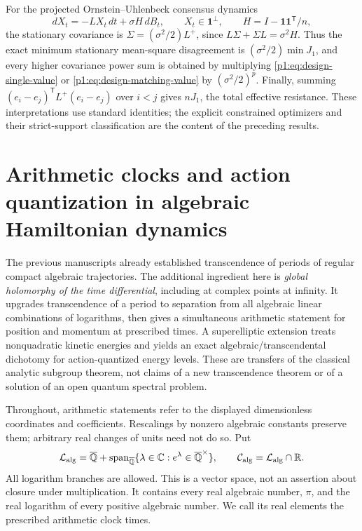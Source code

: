 \documentclass[11pt,a4paper]{article}
\theoremstyle{definition}
\theoremstyle{remark}
\numberwithin{equation}{section}
\begin{document}
For the projected Ornstein--Uhlenbeck consensus dynamics
\[
 dX_t=-LX_t\,dt+\sigma H\,dB_t,\qquad X_t\in\mathbf1^\perp,
 \qquad H=I-\mathbf1\mathbf1^{\mathsf T}/n,
\]
the stationary covariance is $\Sigma=(\sigma^2/2)L^+$, since
$L\Sigma+\Sigma L=\sigma^2H$.
Thus the exact minimum stationary mean-square disagreement is
$(\sigma^2/2)\min J_1$, and every higher covariance power sum is obtained
by multiplying \eqref{p1:eq:design-single-value} or
\eqref{p1:eq:design-matching-value} by $(\sigma^2/2)^p$.
Finally, summing $(e_i-e_j)^{\mathsf T}L^+(e_i-e_j)$ over $i<j$ gives
$nJ_1$, the total effective resistance.  These interpretations use standard
identities; the explicit constrained optimizers and their strict-support
classification are the content of the preceding results.



\section{Arithmetic clocks and action quantization in algebraic Hamiltonian dynamics}
\label{p1:pt:section}

The previous manuscripts already established transcendence of periods of
regular compact algebraic trajectories.  The additional ingredient here is
\emph{global holomorphy of the time differential}, including at complex
points at infinity.  It upgrades transcendence of a period to separation
from all algebraic linear combinations of logarithms, then gives a
simultaneous arithmetic statement for position and momentum at prescribed
times.  A superelliptic extension treats nonquadratic kinetic energies and
yields an exact algebraic/transcendental dichotomy for action-quantized
energy levels.  These are transfers of the classical analytic subgroup
theorem, not claims of a new transcendence theorem or of a solution of an
open quantum spectral problem.

Throughout, arithmetic statements refer to the displayed dimensionless
coordinates and coefficients.  Rescalings by nonzero algebraic constants
preserve them; arbitrary real changes of units need not do so.  Put
\[
 \mathcal L_{\rm alg}=\overline{\mathbb Q}+
 \operatorname{span}_{\overline{\mathbb Q}}
 \{\lambda\in\mathbb C:e^\lambda\in\overline{\mathbb Q}^{\times}\},
 \qquad \mathcal C_{\rm alg}=\mathcal L_{\rm alg}\cap\mathbb R.
\]
All logarithm branches are allowed.  This is a vector space, not an
assertion about closure under multiplication.  It contains every real
algebraic number, $\pi$, and the real logarithm of every positive algebraic
number.  We call its real elements the prescribed arithmetic clock times.
\end{document}
